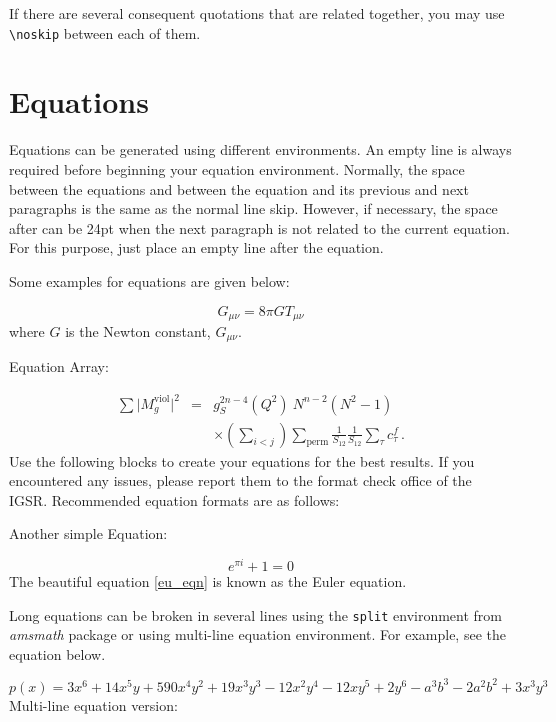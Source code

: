 If there are several consequent quotations that are related together, you may use \texttt{\textbackslash{noskip}} between each of them.

\section{Equations}\label{sec:equations}

Equations can be generated using different environments. An empty line is always required before beginning your equation environment. Normally, the space between the equations and between the equation and its previous and next paragraphs is the same as the normal line skip. However, if necessary, the space after can be 24pt when the next paragraph is not related to the current equation. For this purpose, just place an empty line after the equation.

Some examples for equations are given below:

\begin{equation}\label{eq0}
G_{\mu \nu }=8\pi GT_{\mu \nu }
\end{equation}
where $G$ is the Newton constant, $G_{\mu \nu }$.

Equation Array:

\begin{eqnarray}
  \sum \vert M^{\text{viol}}_g \vert ^2
   &=&  g^{2n-4}_S(Q^2)~N^{n-2} (N^2-1)
\nonumber
\\
   &&   \times \left( \sum_{i<j}\right) \sum_{\text{perm}}
            \frac{1}{S_{12}}  \frac{1}{S_{12}} \sum_\tau c^f_\tau
\,.
\label{eq:multilineeq}
\end{eqnarray}
Use the following blocks to create your equations for the best results. If you encountered any issues, please report them to the format check office of the IGSR. Recommended equation formats are as follows: \noskip

Another simple Equation:

\begin{equation} \label{eu_eqn}
  e^{\pi i} + 1 = 0
\end{equation}
The beautiful equation \eqref{eu_eqn} is known as the Euler equation.

Long equations can be broken in several lines using the \texttt{split} environment from \textit{amsmath} package or using multi-line equation environment. For example, see the equation below.

\begin{equation}
p(x) = 3x^6 + 14x^5y + 590x^4y^2 + 19x^3y^3 - 12x^2y^4 - 12xy^5 + 2y^6 - a^3b^3 - 2a^2b^2 + 3x^3y^3
\end{equation}
Multi-line equation version:

